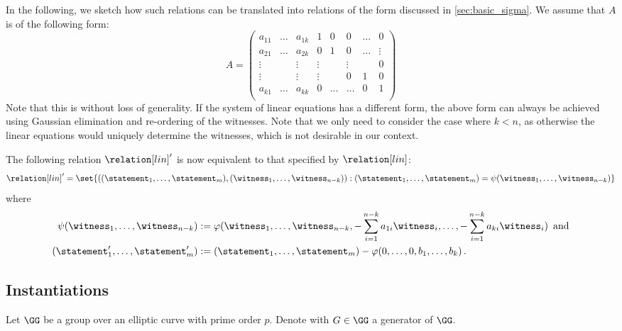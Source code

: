 \documentclass[11pt]{article}
\begin{document}
In the following, we sketch how such relations can be translated into relations of the form discussed in \cref{sec:basic_sigma}.
We assume that $A$ is of the following form:
\begin{equation*}
A = \left(\begin{array}{cccccccc}
      a_{11}     & \dots       & a_{1k}    & 1         & 0       & 0     & \dots    & 0\\
      a_{21}     & \dots       & a_{2k}    & 0         & 1       & 0     & \dots    & \vdots\\
      \vdots     &             & \vdots    & \vdots    &         & \vdots&          & 0\\
      \vdots     &             & \vdots    & \vdots    &         & 0     & 1        & 0\\
      a_{k1}     & \dots       & a_{kk}    & 0         & \dots   & \dots & 0        & 1\\
    \end{array}\right)
\end{equation*}
Note that this is without loss of generality.
If the system of linear equations has a different form, the above form can always be achieved using Gaussian elimination \cite[Sec.~14.4]{shoup08} and re-ordering of the witnesses.
Note that we only need to consider the case where $k<n$, as otherwise the linear equations would uniquely determine the witnesses, which is not desirable in our context.

The following relation $\relation[lin]'$ is now equivalent to that specified by $\relation[lin]$:
\begin{equation*}
\relation[lin]'=\set{((\statement_1,\dots,\statement_m),(\witness_1,\dots,\witness_{n-k})) :
(\statement_1,\dots,\statement_m)=\psi(\witness_1,\dots,\witness_{n-k})}
\end{equation*}
where
\begin{align*}
  \psi(\witness_1,\dots,\witness_{n-k}) &:= \varphi(\witness_1,\dots,\witness_{n-k},-\sum_{i=1}^{n-k}a_{1i}\witness_i,\dots,-\sum_{i=1}^{n-k}a_{ki}\witness_i)\,\text{ and}\\
  (\statement_1',\dots,\statement_m')   &:= (\statement_1,\dots,\statement_m) - \varphi(0,\dots,0,b_1,\dots,b_k)\,.
\end{align*}


\subsection{Instantiations}\label{sec:instantiations}
Let $\GG$ be a group over an elliptic curve with prime order $p$. Denote with $G \in \GG$ a generator of $\GG$.
\end{document}
